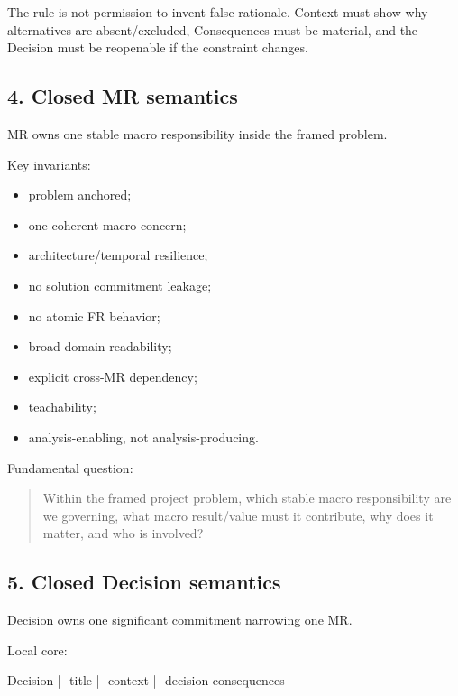 \documentclass[
  10pt,
]{article}
\newenvironment{Shaded}{}{}
\newcommand{\NormalTok}[1]{#1}
\providecommand{\tightlist}{%
  \setlength{\itemsep}{0pt}\setlength{\parskip}{0pt}}
\begin{document}
The rule is not permission to invent false rationale. Context must show
why alternatives are absent/excluded, Consequences must be material, and
the Decision must be reopenable if the constraint changes.

\subsection{4. Closed MR semantics}\label{4-closed-mr-semantics}

MR owns one stable macro responsibility inside the framed problem.

Key invariants:

\begin{itemize}
\tightlist
\item
  problem anchored;
\item
  one coherent macro concern;
\item
  architecture/temporal resilience;
\item
  no solution commitment leakage;
\item
  no atomic FR behavior;
\item
  broad domain readability;
\item
  explicit cross-MR dependency;
\item
  teachability;
\item
  analysis-enabling, not analysis-producing.
\end{itemize}

Fundamental question:

\begin{quote}
Within the framed project problem, which stable macro responsibility are
we governing, what macro result/value must it contribute, why does it
matter, and who is involved?
\end{quote}

\subsection{5. Closed Decision
semantics}\label{5-closed-decision-semantics}

Decision owns one significant commitment narrowing one MR.

Local core:

\begin{Shaded}
\begin{Highlighting}[]
\NormalTok{Decision}
\NormalTok{|{-} title}
\NormalTok{|{-} context}
\NormalTok{|{-} decision}
\NormalTok{\textasciigrave{}{-} consequences}
\end{Highlighting}
\end{Shaded}
\end{document}

